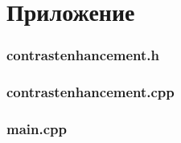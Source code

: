 \documentclass[a4paper,12pt]{article}
\begin{document}
    

    \section*{Приложение}\label{prog}
    
    \vspace{5mm}
    
    \subsubsection*{contrast\textunderscore enhancement.h}
    
    
    \vspace{1cm}
    
    \subsubsection*{contrast\textunderscore enhancement.cpp}
    
    
    \vspace{1cm}
    
    \subsubsection*{main.cpp}
    
        
\end{document}
